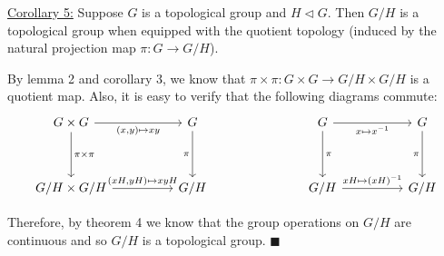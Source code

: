 \documentclass{book}
\newcommand{\pracTwo}{
   \color{Orange}%
   \fontsize{12}{14}\selectfont%
}
\newenvironment{myIndent}{%
   \begin{adjustwidth}{2.5em}{0em}%
}{%
   \end{adjustwidth}%
}
\newcommand{\mySepTwo}[1][.]{%
   {\noindent\color{#1}{\rule{6.5in}{0.5mm}}}\\%
}
\newcommand{\retTwo}{\hfill\bigbreak}
\begin{document}
\ul{Corollary 5:} Suppose $G$ is a topological group and $H \lhd G$. Then $G/H$ is a topological group when equipped with the quotient topology (induced by the natural projection map $\pi : G \to G/H$).
\begin{myIndent}\pracTwo
	By lemma 2 and corollary 3, we know that $\pi \times \pi : G \times G \to G/H \times G/H$ is a quotient map. Also, it is easy to verify that the following diagrams commute:
	\[\begin{tikzcd}
		{G\times G} && G &&& G && G \\
		\\
		{G/H \times G/H} && {G/H} &&& {G/H} && {G/H}
		\arrow["{(x, y) \mapsto xy}"', from=1-1, to=1-3]
		\arrow["{\pi \times \pi}", from=1-1, to=3-1]
		\arrow["\pi"', from=1-3, to=3-3]
		\arrow["{x \mapsto x^{-1}}"', from=1-6, to=1-8]
		\arrow["\pi", from=1-6, to=3-6]
		\arrow["\pi"', from=1-8, to=3-8]
		\arrow["{(xH, yH) \mapsto xyH}", from=3-1, to=3-3]
		\arrow["{xH \mapsto (xH)^{-1}}", from=3-6, to=3-8]
	\end{tikzcd}\]

	Therefore, by theorem 4 we know that the group operations on $G/H$ are continuous and so $G/H$ is a topological group. $\blacksquare$\retTwo
\end{myIndent}

\mySepTwo
\end{document}
